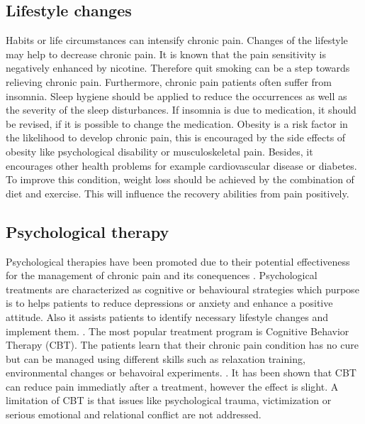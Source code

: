 \subsection{Lifestyle changes}
Habits or life circumstances can intensify chronic pain. Changes of the lifestyle may help to decrease chronic pain. It is known that the pain sensitivity is negatively enhanced by nicotine. Therefore quit smoking can be a step towards relieving chronic pain.
Furthermore, chronic pain patients often suffer from insomnia. Sleep hygiene should be applied to reduce the occurrences as well as the severity of the sleep disturbances. If insomnia is due to medication, it should be revised, if it is possible to change the medication.
Obesity is a risk factor in the likelihood to  develop chronic pain, this is encouraged by the side effects of obesity like psychological disability or musculoskeletal pain. Besides, it encourages other health problems for example cardiovascular disease or diabetes. To improve this condition, weight loss should be achieved by the combination of diet and exercise. This will influence the recovery abilities from pain positively. \cite{marcus2009,pope2017}

\subsection{Psychological therapy}

Psychological therapies have been promoted due to their potential effectiveness for the management of chronic pain and its conequences \cite{Eccleston2002}. Psychological treatments are characterized as cognitive or behavioural strategies \cite{Eccleston2013}which purpose is to helps patients to reduce depressions or anxiety and enhance a positive attitude. Also it assists patients to identify necessary lifestyle changes and implement them. \cite{marcus2009,pope2017}. The most popular treatment program is Cognitive Behavior Therapy (CBT). The patients learn that their chronic pain condition has no cure but can be managed using different skills such as relaxation training, environmental changes or behavoiral experiments. \cite{Burger2016}. It has been shown that CBT can reduce pain immediatly after a treatment, however the effect is slight\cite{Eccleston2013}. A limitation of CBT is that issues like psychological trauma, victimization or serious emotional and relational conflict are not addressed.

